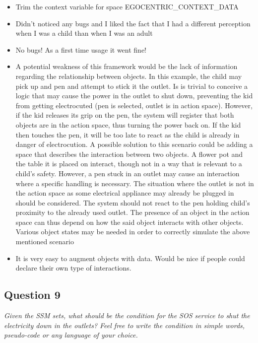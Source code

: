 \begin{itemize}
	\item Trim the context variable for space EGOCENTRIC\_CONTEXT\_DATA
	\item Didn't noticed any bugs and I liked the fact that I had a different perception when I was a child than when I was an adult
	\item No bugs! As a first time usage it went fine!
	\item A potential weakness of this framework would be the lack of information regarding the relationship between objects. In this example, the child may pick up and pen and attempt to stick it the outlet. Is is trivial to conceive a logic that may cause the power in the outlet to shut down, preventing the kid from getting electrocuted (pen is selected, outlet is in action space). However, if the kid releases its grip on the pen, the system will register that both objects are in the action space, thus turning the power back on. If the kid then touches the pen, it will be too late to react as the child is already in danger of electrocution. A possible solution to this scenario could be adding a space that describes the interaction between two objects. A flower pot and the table it is placed on interact, though not in a way that is relevant to a child's safety. However, a pen stuck in an outlet may cause an interaction where a specific handling is necessary. The situation where the outlet is not in the action space as some electrical appliance may already be plugged in should be considered. The system should not react to the pen holding child's proximity to the already used outlet. The presence of an object in the action space can thus depend on how the said object interacts with other objects. Various object states may be needed in order to correctly simulate the above mentioned scenario
	\item It is very easy to augment objects with data. Would be nice if people could declare their own type of interactions.
\end{itemize}

\subsection{Question 9}\label{question2:9}
\emph{Given the SSM sets, what should be the condition for the SOS service to shut the electricity down in the outlets? Feel free to write the condition in simple words, pseudo-code or any language of your choice.}

